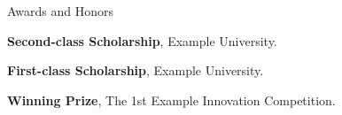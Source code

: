 \begin{rubric}{Awards and Honors}

\entry*[2024] \textbf{Second-class Scholarship}, Example University.

\entry*[2023] \textbf{First-class Scholarship}, Example University.

\entry*[2022] \textbf{Winning Prize}, The 1st Example Innovation Competition.

\end{rubric}
